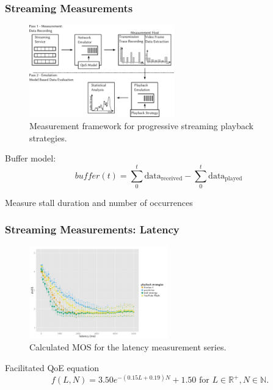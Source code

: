 \documentclass{beamer}
\begin{document}
\begin{frame}
	\frametitle{Streaming Measurements}

	\begin{figure}
		\includegraphics[height=4cm]{../../chapters/03-streaming/images/measurement-model.pdf}
		\caption{Measurement framework for progressive streaming playback strategies.}
	\end{figure}

	Buffer model:
	\begin{equation*}
		\mathit{buffer}(t) = \sum_{0}^{t} \text{data}_\mathrm{received} - \sum_{0}^{t} \text{data}_\mathrm{played}
	\end{equation*}

	Measure stall duration and number of occurrences



\end{frame}



\begin{frame}
	\frametitle{Streaming Measurements: Latency}

	\begin{figure}
		\includegraphics[height=4cm]{../../chapters/03-streaming/images/R-playbackemulation-qoe-latency.pdf}
		\caption{Calculated MOS for the latency measurement series.}
	\end{figure}
	Facilitated QoE equation \cite{hossfeld2013youtubeqoe}
	\begin{equation*}
		\phantom{.} f(L,N) = 3.50e^{-(0.15L +0.19)N} + 1.50 \text{ for } L \in \mathbb{R}^{+}, N \in \mathbb{N}.
	\end{equation*}

\end{frame}
\end{document}
